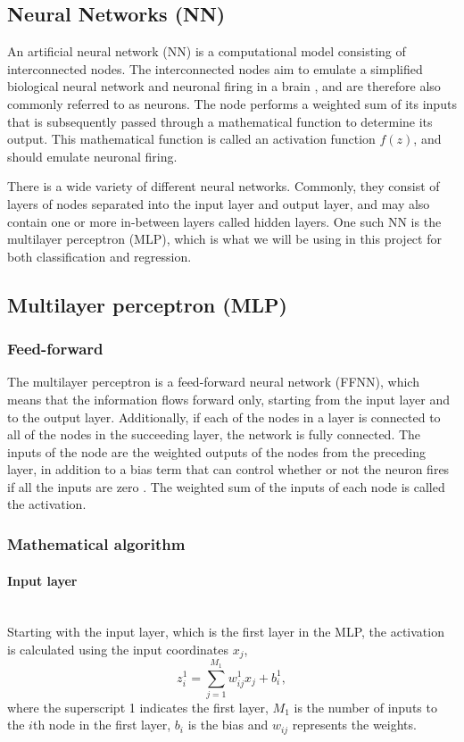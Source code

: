 \documentclass[a4paper, 11pt, twocolumn]{article}
\newcommand{\myparagraph}[1]{\paragraph{#1}\mbox{}\\}
\begin{document}
\subsection{Neural Networks (NN)}

An artificial neural network (NN) is a computational model consisting of
interconnected nodes. The interconnected nodes aim to emulate a simplified
biological neural network and neuronal firing in a brain , and are therefore
also commonly referred to as neurons.  The node performs a weighted sum of its
inputs that is subsequently passed through a mathematical function to determine
its output. This mathematical function is called an activation function $f(z)$,
and should emulate neuronal firing.

There is a wide variety of different neural networks. Commonly, they consist of
layers of nodes separated into the input layer and output layer, and may also
contain one or more in-between layers called hidden layers. One such NN is the
multilayer perceptron (MLP), which is what we will be using in this project for
both classification and regression.
\subsection{Multilayer perceptron (MLP)}

\subsubsection{Feed-forward  }
The multilayer perceptron is a feed-forward neural network (FFNN), which means
that the information flows forward only, starting from the input layer and to
the output layer. Additionally, if each of the nodes in a layer is connected to
all of the nodes in the succeeding layer, the network is fully connected. The
inputs of the node are the weighted outputs of the nodes from the preceding
layer, in addition to a bias term that can control whether or not the neuron
fires if all the inputs are zero \cite{ML_algo}. The weighted sum of the inputs
of each node is called the activation.

\subsubsection*{Mathematical algorithm} \myparagraph{Input layer}
Starting with the input layer, which is the first layer in the MLP, the
activation is calculated using the input coordinates $x_j$,
\begin{equation}
z_i^1 = \sum^{M_1}_{j=1}w_{ij}^1x_j + b_i^1,
\end{equation}
where the superscript 1 indicates the first layer, $M_1$ is the number of inputs
to the $i$th node in the first layer, $b_i$ is the bias and $w_{ij}$ represents
the weights.
\end{document}
